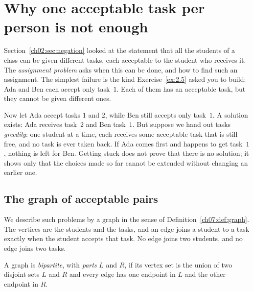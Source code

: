 \section{Why one acceptable task per person is not enough}\label{ch08:sec:model}
Section~\ref{ch02:sec:negation} looked at the statement that all the students of a class can be given different tasks, each acceptable to the student who receives it. The \emph{assignment problem} asks when this can be done, and how to find such an assignment. The simplest failure is the kind Exercise~\ref{ex:2.5} asked you to build: Ada and Ben each accept only task~$1$. Each of them has an acceptable task, but they cannot be given different ones.

Now let Ada accept tasks $1$ and $2$, while Ben still accepts only task~$1$. A solution exists: Ada receives task~$2$ and Ben task~$1$. But suppose we hand out tasks \emph{greedily}: one student at a time, each receives some acceptable task that is still free, and no task is ever taken back. If Ada comes first and happens to get task~$1$, nothing is left for Ben. Getting stuck does not prove that there is no solution; it shows only that the choices made so far cannot be extended without changing an earlier one.

\subsection*{The graph of acceptable pairs}
We describe such problems by a graph in the sense of Definition~\ref{ch07:def:graph}. The vertices are the students and the tasks, and an edge joins a student to a task exactly when the student accepts that task. No edge joins two students, and no edge joins two tasks.

\par\noindent\begin{minipage}{\linewidth}
\begin{definition}\label{ch08:def:bipartite}
A graph is \emph{bipartite}, with \emph{parts} $L$ and $R$, if its vertex set is the union of two disjoint sets $L$ and $R$ and every edge has one endpoint in $L$ and the other endpoint in $R$.
\end{definition}
\end{minipage}\par

